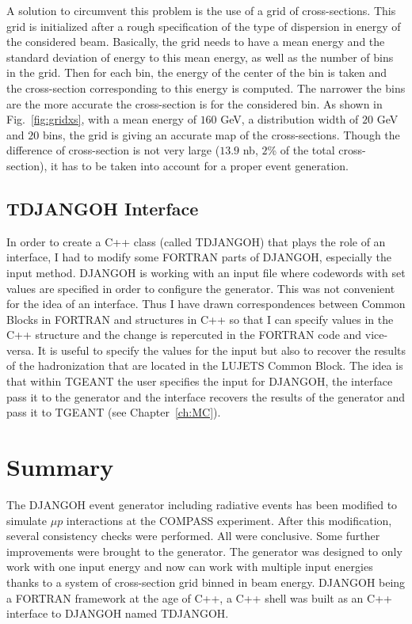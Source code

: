 A solution to circumvent this problem is the use of a grid of cross-sections. This grid is initialized after a rough specification of the type of dispersion in energy of the considered beam. Basically, the grid needs to have a mean energy and the standard deviation of energy to this mean energy, as well as the number of bins in the grid. Then for each bin, the energy of the center of the bin is taken and the cross-section corresponding to this energy is computed. The narrower the bins are the more accurate the cross-section is for the considered bin. As shown in Fig.~\ref{fig:gridxs}, with a mean energy of $160$ GeV, a distribution width of $20$ GeV and $20$ bins, the grid is giving an accurate map of the cross-sections. Though the difference of cross-section is not very large ($13.9$ nb, $2$\% of the total cross-section), it has to be taken into account for a proper event generation.

\subsection{TDJANGOH Interface}

In order to create a C++ class (called TDJANGOH) that plays the role of an interface, I had to modify some FORTRAN parts of DJANGOH, especially the input method. DJANGOH is working with an input file where codewords with set values are specified in order to configure the generator. This was not convenient for the idea of an interface. Thus I have drawn correspondences between Common Blocks in FORTRAN and structures in C++ so that I can specify values in the C++ structure and the change is repercuted in the FORTRAN code and vice-versa. It is useful to specify the values for the input but also to recover the results of the hadronization that are located in the LUJETS Common Block. The idea is that within TGEANT the user specifies the input for DJANGOH, the interface pass it to the generator and the interface recovers the results of the generator and pass it to TGEANT (see Chapter~\ref{ch:MC}).


\section{Summary}

The DJANGOH event generator including radiative events has been modified to simulate $\mu p$ interactions at the COMPASS experiment. After this modification, several consistency checks were performed. All were conclusive. Some further improvements were brought to the generator. The generator was designed to only work with one input energy and now can work with multiple input energies thanks to a system of cross-section grid binned in beam energy. DJANGOH being a FORTRAN framework at the age of C++, a C++ shell was built as an C++ interface to DJANGOH named TDJANGOH.
